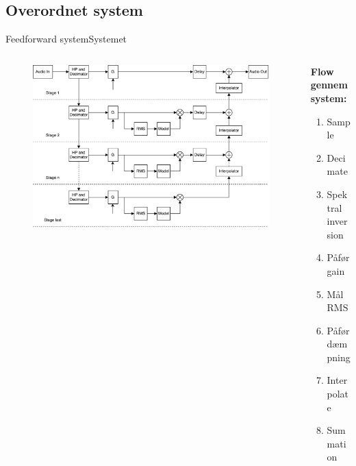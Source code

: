 \documentclass[10pt,aspectratio=169]{beamer}
\begin{document}
\subsection{Overordnet system}
\begin{frame}{Feedforward system}{Systemet}

\begin{columns}
  \begin{column}{0.75\textwidth}
\begin{figure}
\includegraphics[width=\textwidth]{designRealBlock1}
\end{figure}
  \end{column}

  \begin{column}{0.25\textwidth}
  \textbf{Flow gennem system:}
     \begin{enumerate}
        \item Sample
        \item Decimate
        \item Spektral inversion
        \item Påfør gain
        \item Mål RMS
        \item Påfør dæmpning
        \item Interpolate
        \item Summation
     \end{enumerate}
  \end{column}
\end{columns}
\end{frame}
\end{document}
